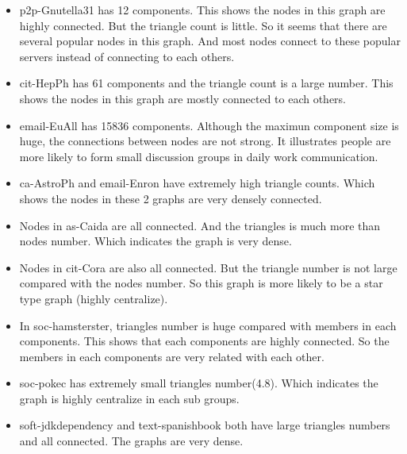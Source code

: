 \begin{itemize} 
\item p2p-Gnutella31 has 12 components. This shows the nodes in this graph are highly connected. But the triangle count is little. So it seems that there are several popular nodes in this graph. And most nodes connect to these popular servers instead of connecting to each others. \\
\item cit-HepPh has 61 components and the triangle count is a large number. This shows the nodes in this graph are mostly connected to each others. \\
\item email-EuAll has 15836 components. Although the maximun component size is huge, the connections between nodes are not strong. It illustrates people are more likely to form small discussion groups in daily work communication.\\
\item ca-AstroPh and email-Enron have extremely high triangle counts. Which shows the nodes in these 2 graphs are very densely connected.\\
\item Nodes in as-Caida are all connected. And the triangles is much more than nodes number. Which indicates the graph is very dense. \\
\item Nodes in cit-Cora are also all connected. But the triangle number is not large compared with the nodes number. So this graph is more likely to be a star type graph (highly centralize).\\
\item In soc-hamsterster, triangles number is huge compared with members in each components. This shows that each components are highly connected. So the members in each components are very related with each other.\\
\item soc-pokec has extremely small triangles number(4.8). Which indicates the graph is highly centralize in each sub groups.\\
\item soft-jdkdependency and text-spanishbook both have large triangles numbers and all connected. The graphs are very dense. \\
\end{itemize} 
\\
